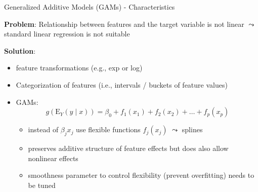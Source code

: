 \documentclass[11pt,compress,t,notes=noshow, aspectratio=169, xcolor=table]{beamer}
\begin{document}
\begin{frame}{Generalized Additive Models (GAMs) - Characteristics}

\textbf{Problem}: Relationship between features and the target variable is not linear $\leadsto$ standard linear regression is not suitable 

\medskip
\textbf{Solution}: 
 \begin{itemize}
        \item feature transformations (e.g., exp or log)
        \item Categorization of features (i.e., intervals / buckets of feature values)
        \item GAMs:
        $$g(\mathrm{E}_Y (y\mid x)) = \beta_0 + f_1(x_1) + f_2(x_2) + \ldots + f_p(x_p)$$
    
    \begin{itemize}
        \item instead of $\beta_j x_j$ use flexible functions $f_j(x_j)$ $\leadsto$ splines
        \item preserves additive structure of feature effects but does also allow nonlinear effects
        \item smoothness parameter to control flexibility (prevent overfitting) needs to be tuned
    \end{itemize}
    \end{itemize}
    
    

   

\end{frame}
\end{document}
